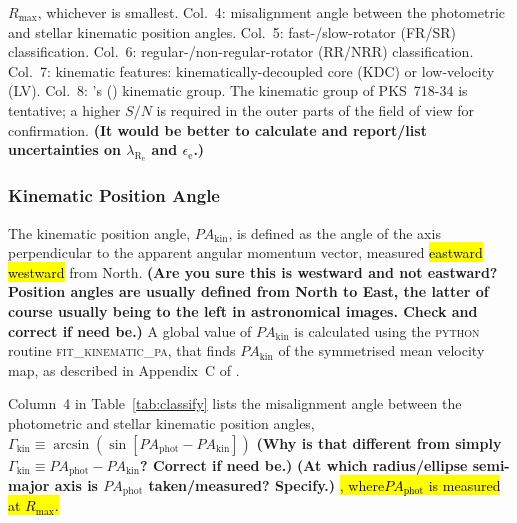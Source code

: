 \documentclass[a4paper,fleqn,usenatbib]{mnras}
\DeclareRobustCommand{\removed}[1]{{\sethlcolor{red}\hl{#1}}}
\DeclareRobustCommand{\added}[1]{{\sethlcolor{green}\hl{#1}}}
\begin{document}
\begin{table}[t]
\begin{center}
{      $R_\text{max}$, whichever is smallest. Col.~4: misalignment
      angle between the photometric and stellar kinematic position
      angles. Col.~5: fast-/slow-rotator (FR/SR)
      classification. Col.~6: regular-/non-regular-rotator (RR/NRR)
      classification. Col.~7: kinematic features:
      kinematically-decoupled core (KDC) or low-velocity (LV). Col.~8:
      \citeauthor{Krajnovic2011}'s (\citeyear{Krajnovic2011})
      kinematic group. The kinematic group of PKS~718-34 is tentative;
      a higher $S/N$ is required in the outer parts of the field of
      view for confirmation. {\bf (It would be better to calculate and
        report/list uncertainties on $\lambda_\mathrm{R_e}$ and
        $\epsilon_\text{e}$.)}}
  \end{center}
\end{table}
  
\subsubsection{Kinematic Position Angle}
\label{subsubsec:KinPA}

The kinematic position angle, $PA_\text{kin}$, is defined as the angle
of the axis perpendicular to the apparent angular momentum vector,
measured \added{eastward} \removed{westward} from North. {\bf (Are you sure this is westward and
  not eastward? Position angles are usually defined from North to
  East, the latter of course usually being to the left in astronomical
  images. Check and correct if need be.)} A global value of
$PA_\text{kin}$ is calculated using the \textsc{python} routine
\textsc{fit\_kinematic\_pa}\footnotemark[1], that finds
$PA_\text{kin}$ of the symmetrised mean velocity map, as described in
Appendix~C of \citet{Krajnovic2006}.

Column~4 in Table~\ref{tab:classify} lists the misalignment angle
between the photometric and stellar kinematic position angles,
$\Gamma_\text{kin}\equiv\arcsin(\sin[PA_\text{phot}-PA_\text{kin}])$
{\bf (Why is that different from simply
  $\Gamma_\text{kin}\equiv PA_\text{phot}-PA_\text{kin}$? Correct if
  need be.)} {\bf (At which radius/ellipse semi-major axis is
  $PA_\text{phot}$ taken/measured? Specify.)} \added{, where$PA_\text{phot}$ is measured at $R_\text{max}$.}
\end{document}
